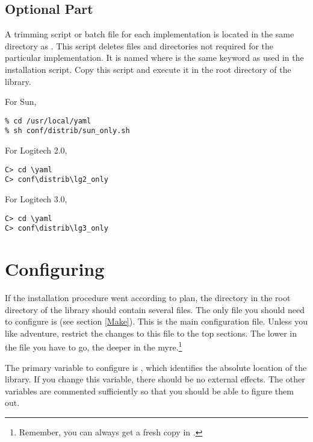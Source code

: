\subsection{Optional Part}


A trimming script or batch file for each implementation is located
in the same directory as .
This script deletes files and directories not required for the particular
implementation.  It is named  where  is the
same keyword as used in the installation script.  Copy this script
and execute it in the root directory of the library.  

\newpage
For Sun,
\begin{verbatim}
% cd /usr/local/yaml
% sh conf/distrib/sun_only.sh
\end{verbatim}

For Logitech 2.0,
\begin{verbatim}
C> cd \yaml
C> conf\distrib\lg2_only
\end{verbatim}

For Logitech 3.0,
\begin{verbatim}
C> cd \yaml
C> conf\distrib\lg3_only
\end{verbatim}


\section{Configuring}
 

If the installation procedure went according to plan, the
 directory in the root directory of the library should
contain several files.  The only file you should need to configure
is  (see section \ref{Make}).
This is the main configuration file.  Unless you like
adventure, restrict the changes to this file to the top sections.
The lower in the file you have to go, the deeper in the myre.\footnote{
    Remember, you can always get a fresh copy in 
    .
    }

The primary variable to configure is , which identifies
the absolute location of the library.  If you change this variable,
there should be no external effects.  The other variables are 
commented sufficiently so that you should be able to figure them out.  

